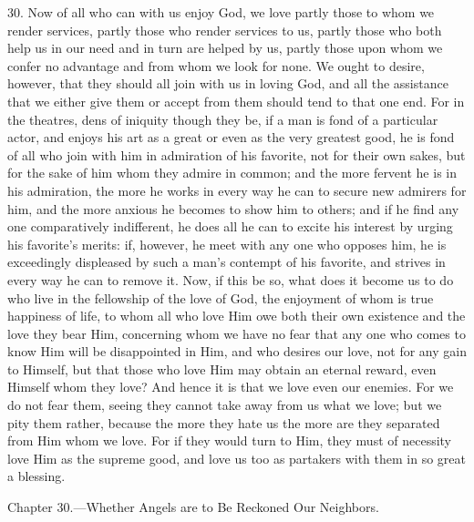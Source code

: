 30. Now of all who can with us enjoy God, we love partly those to whom we render services, partly those who render services to us, partly those who both help us in our need and in turn are helped by us, partly those upon whom we confer no advantage and from whom we look for none. We ought to desire, however, that they should all join with us in loving God, and all the assistance that we either give them or accept from them should tend to that one end. For in the theatres, dens of iniquity though they be, if a man is fond of a particular actor, and enjoys his art as a great or even as the very greatest good, he is fond of all who join with him in admiration of his favorite, not for their own sakes, but for the sake of him whom they admire in common; and the more fervent he is in his admiration, the more he works in every way he can to secure new admirers for him, and the more anxious he becomes to show him to others; and if he find any one comparatively indifferent, he does all he can to excite his interest by urging his favorite’s merits: if, however, he meet with any one who opposes him, he is exceedingly displeased by such a man’s contempt of his favorite, and strives in every way he can to remove it. Now, if this be so, what does it become us to do who live in the fellowship of the love of God, the enjoyment of whom is true happiness of life, to whom all who love Him owe both their own existence and the love they bear Him, concerning whom we have no fear that any one who comes to know Him will be disappointed in Him, and who desires our love, not for any gain to Himself, but that those who love Him may obtain an eternal reward, even Himself whom they love? And hence it is that we love even our enemies. For we do not fear them, seeing they cannot take away from us what we love; but we pity them rather, because the more they hate us the more are they separated from Him whom we love. For if they would turn to Him, they must of necessity love Him as the supreme good, and love us too as partakers with them in so great a blessing.


Chapter 30.—Whether Angels are to Be Reckoned Our Neighbors.


